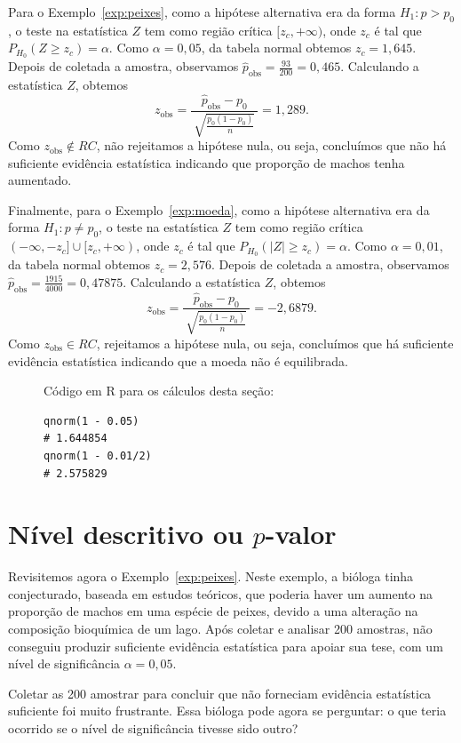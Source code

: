 \documentclass[12pt,a4paper]{article}
\theoremstyle{plain}
\theoremstyle{definition}
\theoremstyle{remark}
\begin{document}
Para o Exemplo~\ref{exp:peixes}, como a hipótese alternativa era da forma $H_1:p>p_0$, o teste na estatística $Z$ tem como região crítica $[z_c, +\infty)$, onde $z_c$ é tal que $P_{H_0}(Z \geq z_c) = \alpha$.
Como $\alpha=0,05$, da tabela normal obtemos $z_c = 1,645$.
Depois de coletada a amostra, observamos $\hat{p}_{\mathrm{obs}} = \frac{93}{200} = 0,465$.
Calculando a estatística $Z$, obtemos
\[
z_{\mathrm{obs}} = \frac{\hat{p}_{\mathrm{obs}}-p_0}{\ \sqrt{\frac{p_0(1-p_0)}{n}}\ }
=
1,289
.
\]
Como $z_{\mathrm{obs}} \not\in RC$, não rejeitamos a hipótese nula, ou seja, concluímos que não há suficiente evidência estatística indicando que proporção de machos tenha aumentado.

Finalmente, para o Exemplo~\ref{exp:moeda}, como a hipótese alternativa era da forma $H_1:p \ne p_0$, o teste na estatística $Z$ tem como região crítica $(-\infty, -z_{c}] \cup [z_c, +\infty)$, onde $z_c$ é tal que $P_{H_0}(|Z| \geq z_c) = \alpha$.
Como $\alpha=0,01$, da tabela normal obtemos $z_c = 2,576$.
Depois de coletada a amostra, observamos $\hat{p}_{\mathrm{obs}} = \frac{1915}{4000} = 0,47875$.
Calculando a estatística $Z$, obtemos
\[
z_{\mathrm{obs}} = \frac{\hat{p}_{\mathrm{obs}}-p_0}{\ \sqrt{\frac{p_0(1-p_0)}{n}}\ }
=
-2,6879
.
\]
Como $z_{\mathrm{obs}} \in RC$, rejeitamos a hipótese nula, ou seja, concluímos que há suficiente evidência estatística indicando que a moeda não é equilibrada.

\begin{figure}[H]
Código em R para os cálculos desta seção:
\footnotesize
\begin{verbatim}
qnorm(1 - 0.05)
# 1.644854
qnorm(1 - 0.01/2)
# 2.575829
\end{verbatim}
\end{figure}


\section{Nível descritivo ou $p$-valor}

Revisitemos agora o Exemplo~\ref{exp:peixes}. Neste exemplo, a bióloga tinha conjecturado, baseada em estudos teóricos, que poderia haver um aumento na proporção de machos em uma espécie de peixes, devido a uma alteração na composição bioquímica de um lago. Após coletar e analisar 200 amostras, não conseguiu produzir suficiente evidência estatística para apoiar sua tese, com um nível de significância $\alpha=0,05$.

Coletar as 200 amostrar para concluir que não forneciam evidência estatística suficiente foi muito frustrante.
Essa bióloga pode agora se perguntar: o que teria ocorrido se o nível de significância tivesse sido outro?
\end{document}
